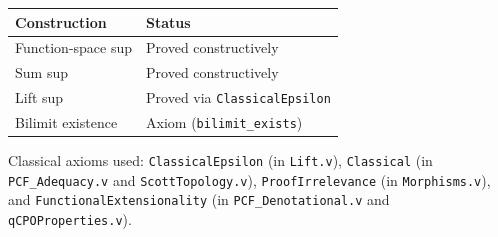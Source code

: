 \begin{table}[h]
\centering
\small
\begin{tabular}{@{}l l@{}}
\toprule
\textbf{Construction} & \textbf{Status} \\
\midrule
Function-space sup  & Proved constructively \\
Sum sup             & Proved constructively \\
Lift sup            & Proved via \texttt{ClassicalEpsilon} \\
Bilimit existence   & Axiom (\texttt{bilimit\_exists}) \\
\bottomrule
\end{tabular}
\end{table}

Classical axioms used: \texttt{ClassicalEpsilon} (in \texttt{Lift.v}),
\texttt{Classical} (in \texttt{PCF\_Adequacy.v} and
\texttt{ScottTopology.v}), \texttt{ProofIrrelevance} (in
\texttt{Morphisms.v}), and \texttt{FunctionalExtensionality} (in
\texttt{PCF\_Denotational.v} and \texttt{qCPOProperties.v}).
